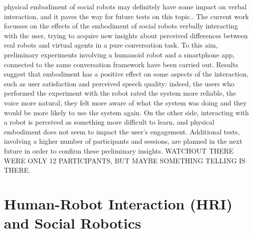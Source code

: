 physical embodiment of social robots may definitely have some impact on verbal interaction, and it paves the way for future tests on this topic.. The current work focusses on the effects of the embodiment of social robots verbally interacting with the user, trying to acquire new insights about perceived differences between real robots and virtual agents in a pure conversation task. To this aim, preliminary experiments involving a humanoid robot and a smartphone app, connected to the same conversation framework have been carried out. Results suggest that embodiment has a positive effect on some aspects of the interaction, such as user satisfaction and perceived speech quality: indeed, the users who performed the experiment with the robot rated the system more reliable, the voice more natural, they felt more aware of what the system was doing and they would be more likely to use the system again. On the other side, interacting with a robot is perceived as something more difficult to learn, and physical embodiment does not seem to impact the user's engagement. Additional tests, involving a higher number of participants and sessions, are planned in the next future in order to confirm these preliminary insights. WATCHOUT THERE WERE ONLY 12 PARTICIPANTS, BUT MAYBE SOMETHING TELLING IS THERE.

\section{Human-Robot Interaction (HRI) and Social Robotics}


